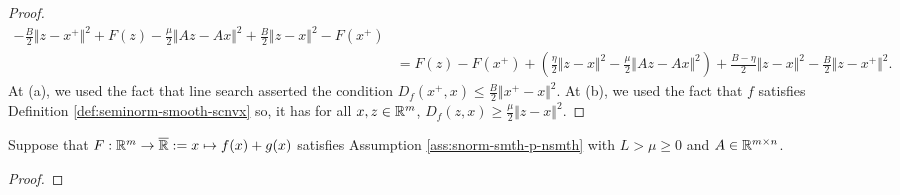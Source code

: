 \documentclass[12pt]{article}
\begin{document}
\begin{proof}
\begin{align*}
                    - \frac{B}{2}\Vert z - x^+\Vert^2 
                    + F(z) - \frac{\mu}{2}\Vert Az - Ax\Vert^2 
                    + \frac{B}{2}\Vert z - x\Vert^2
                    - F(x^+)
                    \\
                    &= F(z) - F(x^+)
                    + \left(
                        \frac{\eta}{2}\Vert z - x\Vert^2 
                        - \frac{\mu}{2}\Vert Az - Ax\Vert^2
                    \right) 
                    + \frac{B - \eta}{2}\Vert z - x\Vert^2
                    - \frac{B}{2}\Vert z - x^+\Vert^2 . 
                \end{align*}
                At (a), we used the fact that line search asserted the condition $D_f(x^+, x) \le \frac{B}{2}\Vert x^+ - x\Vert^2$. 
                At (b), we used the fact that $f$ satisfies Definition \ref{def:seminorm-smooth-scnvx} so, it has for all $x, z \in \mathbb R^m$, $D_f(z, x) \ge \frac{\mu}{2}\Vert z - x\Vert^2$. 
            \end{proof}
            \begin{theorem}\label{thm:smnrm-jnsn-smth-nsmth}
                Suppose that $F:\mathbb R^m \rightarrow \overline {\mathbb R} := x \mapsto f(x) + g(x)$ satisfies Assumption \ref{ass:snorm-smth-p-nsmth} with $L > \mu \ge 0$ and $A \in \mathbb R^{m\times n}$. 
            \end{theorem}
            \begin{proof}
                
            \end{proof}
        
\end{document}
